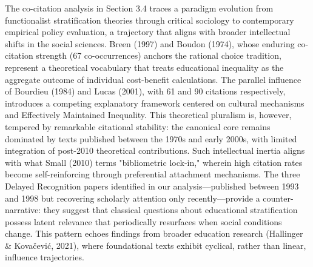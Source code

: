 \documentclass[12pt,a4paper]{article}
\begin{document}
The co-citation analysis in Section 3.4 traces a paradigm evolution from functionalist stratification theories through critical sociology to contemporary empirical policy evaluation, a trajectory that aligns with broader intellectual shifts in the social sciences. Breen (1997) and Boudon (1974), whose enduring co-citation strength (67 co-occurrences) anchors the rational choice tradition, represent a theoretical vocabulary that treats educational inequality as the aggregate outcome of individual cost-benefit calculations. The parallel influence of Bourdieu (1984) and Lucas (2001), with 61 and 90 citations respectively, introduces a competing explanatory framework centered on cultural mechanisms and Effectively Maintained Inequality. This theoretical pluralism is, however, tempered by remarkable citational stability: the canonical core remains dominated by texts published between the 1970s and early 2000s, with limited integration of post-2010 theoretical contributions. Such intellectual inertia aligns with what Small (2010) terms "bibliometric lock-in," wherein high citation rates become self-reinforcing through preferential attachment mechanisms. The three Delayed Recognition papers identified in our analysis—published between 1993 and 1998 but recovering scholarly attention only recently—provide a counter-narrative: they suggest that classical questions about educational stratification possess latent relevance that periodically resurfaces when social conditions change. This pattern echoes findings from broader education research (Hallinger \& Kovačević, 2021), where foundational texts exhibit cyclical, rather than linear, influence trajectories.
\end{document}
